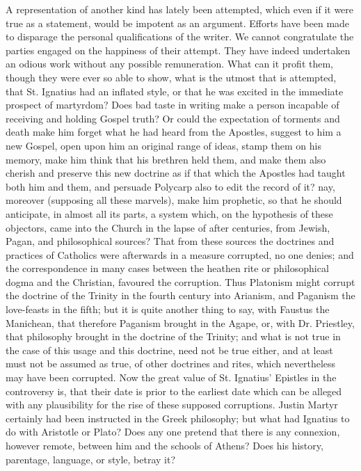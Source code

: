 A representation of another kind has lately been
attempted, which even if it were true as a statement, would be
impotent as an argument. Efforts have been made to disparage the
personal qualifications of the writer. We cannot congratulate the
parties engaged on the happiness of their attempt. They have indeed
undertaken an odious work without any possible remuneration. What can
it profit them, though they were ever so able to show, what is the
utmost that is attempted, that St. Ignatius had an inflated style, or
that he was excited in the immediate prospect of martyrdom? Does bad
taste in writing make a person incapable of receiving and holding
Gospel truth? Or could the expectation of torments and death make him
forget what he had heard from the Apostles, suggest to him a new
Gospel, open upon him an original range of ideas, stamp them on his
memory, make him think that his brethren held them, and make them also
cherish and preserve this new doctrine as if that which the Apostles
had taught both him and them, and persuade Polycarp also to edit
the record of it? nay, moreover (supposing all these marvels), make
him prophetic, so that he should anticipate, in almost all its parts,
a system which, on the hypothesis of these objectors, came into the
Church in the lapse of after centuries, from Jewish, Pagan, and
philosophical sources? That from these sources the doctrines and
practices of Catholics were afterwards in a measure corrupted, no one
denies; and the correspondence in many cases between the heathen rite
or philosophical dogma and the Christian, favoured the corruption.
Thus Platonism might corrupt the doctrine of the Trinity in the fourth
century into Arianism, and Paganism the love-feasts in the fifth; but
it is quite another thing to say, with Faustus the Manichean, that
therefore Paganism brought in the Agape, or, with Dr. Priestley, that
philosophy brought in the doctrine of the Trinity; and what is not
true in the case of this usage and this doctrine, need not be true
either, and at least must not be assumed as true, of other doctrines
and rites, which nevertheless may have been corrupted. Now the great
value of St. Ignatius' Epistles in the controversy is, that their date
is prior to the earliest date which can be alleged with any
plausibility for the rise of these supposed corruptions. Justin Martyr
certainly had been instructed in the Greek philosophy; but what had
Ignatius to do with Aristotle or Plato? Does any one pretend that
there is any connexion, however remote, between him and the schools of
Athens? Does his history, parentage, language, or style, betray it?
